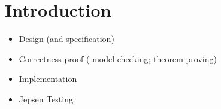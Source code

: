 
\section{Introduction} \label{section:intro}






\begin{itemize}
  \item Design (and \tlaplus{} specification)
  \item Correctness proof (\tlc{} model checking; \tlaps{} theorem proving)
  \item Implementation
  \item Jepsen Testing
\end{itemize}
